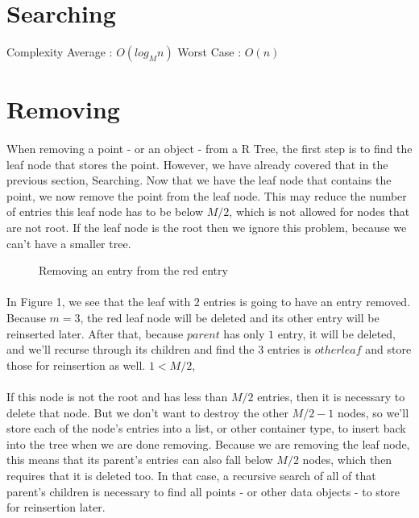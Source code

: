 \documentclass{article}
\begin{document}
\section{Searching}
Complexity
Average : $O(log_Mn)$
Worst Case : $O(n)$

\section{Removing}
\paragraph{}
When removing a point - or an object - from a R Tree, the first step is to find the leaf node that stores the point.
However, we have already covered that in the previous section, Searching. Now that we have the leaf node that contains
the point, we now remove the point from the leaf node. This may reduce the number of entries this leaf node has to be below
$M/2$, which is not allowed for nodes that are not root. If the leaf node is the root then we ignore this problem, because
we can't have a smaller tree.\\
\begin{figure}
\caption{Removing an entry from the red entry}
\centering
{}
\end{figure}
\paragraph{}
In Figure 1, we see that the leaf with $2$ entries is going to have an entry removed. Because $m=3$, the red leaf node will be deleted
and its other entry will be reinserted later.
After that, because $parent$ has only $1$ entry, it will be deleted, and we'll recurse through its children and find the $3$ entries
is $other leaf$ and store those for reinsertion as well.
$1 < M/2$, 
\paragraph{}
If this node is not the root and has less than $M/2$ entries, then it is necessary to delete that node. But we don't want to destroy
the other $M/2 - 1$ nodes, so we'll store each of the node's entries into a list, or other container type, to insert back into
the tree when we are done removing. Because we are removing the leaf node, this means that its parent's entries can also fall below
$M/2$ nodes, which then requires that it is deleted too. In that case, a recursive search of all of that parent's children is necessary
to find all points - or other data objects - to store for reinsertion later.
\end{document}
